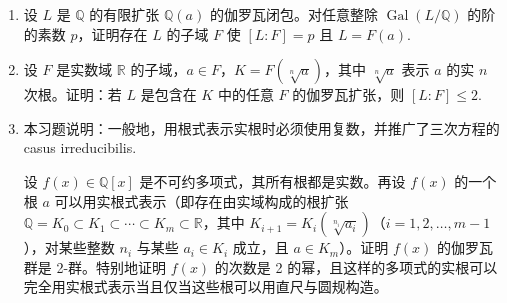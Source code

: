 \begin{enumerate}
（b）证明 \(\eta_0+\eta_1 = (\zeta_p, 1) = -1\)，且 \(\eta_0-\eta_1 = (\zeta_p, -1)\)，其中 \((\zeta_p, 1)\) 与 \((\zeta_p, -1)\) 是 \(\zeta_p\) 的两个 Lagrange 预解式。

（c）设 \(g = \sum_{a=0}^{p-1}\zeta_p^{a^2}\)（经典的 Gauss 和）。证明
\[
g = (\zeta_p, -1) = \sum_{i=0}^{p-2}(-1)^i\sigma_0^i(\zeta_p).
\]

（d）证明：若 \(\tau \in H\) 则 \(\tau g = g\)，若 \(\tau \notin H\) 则 \(\tau g = -g\). 特别地证明 \([\mathbb{Q}(g):\mathbb{Q}] = 2\). 回忆复共轭是 \(K\) 上的自同构 \(\sigma_{-1}\)（参见第 14.5 节习题 7）。证明：若 \(-1\) 是模 \(p\) 的平方（即 \(p \equiv 1 \pmod 4\)）则 \(\bar g = g\)；若 \(-1\) 不是模 \(p\) 的平方（即 \(p \equiv 3 \pmod 4\)）则 \(\bar g = -g\)，其中 \(\bar g\) 表示 \(g\) 的复共轭。

（e）证明 \(g\bar g = p\).〔单位根的复共轭是它的倒数。于是由 \(g = \sum_i(-1)^i\left(\sigma_0^i(\zeta_p)\right)^{-1}\) 可得
\[
g\bar g = \sum_{i,j=0}^{p-2}(-1)^{i-j}\frac{\sigma_0^i(\zeta_p)}{\sigma_0^j(\zeta_p)} = \sum_{k=0}^{p-2}(-1)^k\sum_{j=0}^{p-2}\sigma_0^j\left(\frac{\sigma_0^k(\zeta_p)}{\zeta_p}\right),
\]
其中 \(k = i-j\). 若 \(k = 0\) 则被求和的元素为 1，若 \(k \neq 0\) 则它是本原 \(p\) 次单位根。利用上一习题证明内和当 \(k = 0\) 时为 \(p-1\)，否则为 \(-1\).〕

（f）由此证明 \(g^2 = (-1)^{(p-1)/2}p\)，且 \(\mathbb{Q}\left(\sqrt{(-1)^{(p-1)/2}p}\right)\) 是 \(\mathbb{Q}(\zeta_p)\) 唯一的二次子域。（另见第 14.6 节习题 33。）

\item 设 \(L\) 是 \(\mathbb{Q}\) 的有限扩张 \(\mathbb{Q}(a)\) 的伽罗瓦闭包。对任意整除 \(\operatorname{Gal}(L/\mathbb{Q})\) 的阶的素数 \(p\)，证明存在 \(L\) 的子域 \(F\) 使 \([L:F] = p\) 且 \(L = F(a)\).

\item 设 \(F\) 是实数域 \(\mathbb{R}\) 的子域，\(a \in F\)，\(K = F(\sqrt[n]{a})\)，其中 \(\sqrt[n]{a}\) 表示 \(a\) 的实 \(n\) 次根。证明：若 \(L\) 是包含在 \(K\) 中的任意 \(F\) 的伽罗瓦扩张，则 \([L:F] \leq 2\).

\item 本习题说明：一般地，用根式表示实根时必须使用复数，并推广了三次方程的 casus irreducibilis.

设 \(f(x) \in \mathbb{Q}[x]\) 是不可约多项式，其所有根都是实数。再设 \(f(x)\) 的一个根 \(a\) 可以用实根式表示（即存在由实域构成的根扩张 \(\mathbb{Q} = K_0 \subset K_1 \subset \cdots \subset K_m \subset \mathbb{R}\)，其中 \(K_{i+1} = K_i(\sqrt[n_i]{a_i})\)（\(i = 1, 2, \ldots, m-1\)），对某些整数 \(n_i\) 与某些 \(a_i \in K_i\) 成立，且 \(a \in K_m\)）。证明 \(f(x)\) 的伽罗瓦群是 2-群。特别地证明 \(f(x)\) 的次数是 2 的幂，且这样的多项式的实根可以完全用实根式表示当且仅当这些根可以用直尺与圆规构造。


\end{enumerate}
